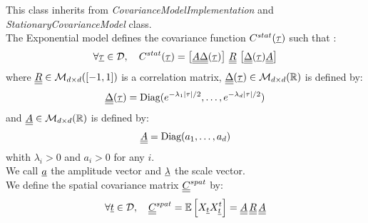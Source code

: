 This class inherits from \textit{CovarianceModelImplementation} and \textit{StationaryCovarianceModel} class. \\
The Exponential model defines the covariance function  $C^{stat}({\underline{\tau}})$ such that :
\begin{equation}
\label{fullMultivariateExponential2}
\forall {\underline{\tau}} \in {\mathcal D},\quad C^{stat}( {\underline{\tau}} )=\left[{\underline{\underline{A}}}{\underline{\underline{\Delta}}}( {\underline{\tau}} ) \right] \,{\underline{\underline{R}}}\, \left[ {\underline{\underline{\Delta}}}( {\underline{\tau}} ){\underline{\underline{A}}}\right]
\end{equation}
where ${\underline{\underline{R}}} \in  \mathcal{M}_{d \times d}([-1, 1])$ is a correlation matrix, ${\underline{\underline{\Delta}}}( {\underline{\tau}} ) \in \mathcal{M}_{d \times d}({\mathbb R})$ is defined by:
\begin{equation}
\label{fullMultivariateExponential3}
{\underline{\underline{\Delta}}}( {\underline{\tau}} )= \mbox{Diag}(e^{-\lambda_1|\tau|/2}, \dots, e^{-\lambda_d|\tau|/2})
\end{equation}
and ${\underline{\underline{A}}}\in \mathcal{M}_{d \times d}({\mathbb R})$ is defined by:
\begin{equation}
\label{fullMultivariateExponential4}
{\underline{\underline{A}}}= \mbox{Diag}(a_1, \dots, a_d)
\end{equation}
whith $\lambda_i>0$ and $a_i>0$ for any $i$.\\
We call ${\underline{a}}$ the amplitude vector and ${\underline{\lambda}}$ the scale vector.\\


We define the spatial covariance matrix ${\underline{\underline{C}}}^{spat}$ by:
\begin{equation}\label{relRA}
\forall {\underline{t}} \in {\mathcal D},\quad {\underline{\underline{C}}}^{spat} = {\mathbb E}\left[ X_{{\underline{t}}}X^t_{{\underline{t}}} \right] = {\underline{\underline{A}}}\,{\underline{\underline{R}}}\, {\underline{\underline{A}}}
\end{equation}



